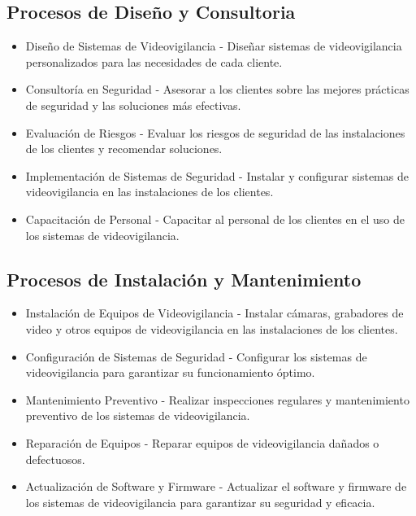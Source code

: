 \documentclass{report}
\begin{document}
          \subsection{Procesos de Diseño y Consultoria}
            \begin{itemize}
              \item Diseño de Sistemas de Videovigilancia - Diseñar sistemas de videovigilancia personalizados para las necesidades de cada cliente.
              \item Consultoría en Seguridad - Asesorar a los clientes sobre las mejores prácticas de seguridad y las soluciones más efectivas.
              \item Evaluación de Riesgos - Evaluar los riesgos de seguridad de las instalaciones de los clientes y recomendar soluciones.
              \item Implementación de Sistemas de Seguridad - Instalar y configurar sistemas de videovigilancia en las instalaciones de los clientes.
              \item Capacitación de Personal - Capacitar al personal de los clientes en el uso de los sistemas de videovigilancia.
            \end{itemize}
          \subsection{Procesos de Instalación y Mantenimiento}
            \begin{itemize}
              \item Instalación de Equipos de Videovigilancia - Instalar cámaras, grabadores de video y otros equipos de videovigilancia en las instalaciones de los clientes.
              \item Configuración de Sistemas de Seguridad - Configurar los sistemas de videovigilancia para garantizar su funcionamiento óptimo.
              \item Mantenimiento Preventivo - Realizar inspecciones regulares y mantenimiento preventivo de los sistemas de videovigilancia.
              \item Reparación de Equipos - Reparar equipos de videovigilancia dañados o defectuosos.
              \item Actualización de Software y Firmware - Actualizar el software y firmware de los sistemas de videovigilancia para garantizar su seguridad y eficacia.
            \end{itemize}
\end{document}
